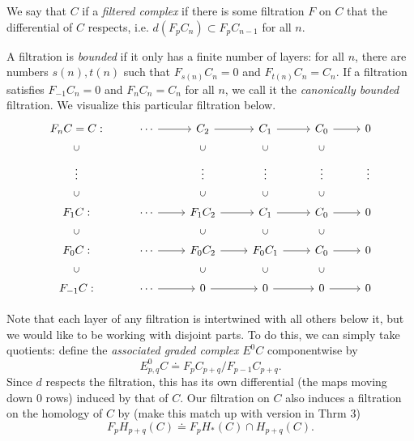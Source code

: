 \documentclass[twoside,10pt]{article}
\begin{document}
\begin{defn}[]
	We say that $C$ if a \textit{filtered complex} if there is some filtration $F$ on $C$ that the differential of $C$ respects, i.e. $d(F_{p}C_{n}) \subset F_{p}C_{n-1}$ for all $n$.
\end{defn}

A filtration is \textit{bounded} if it only has a finite number of layers: for all $n$, there are numbers $s(n), t(n)$ such that $F_{s(n)}C_{n}=0$ and $F_{t(n)}C_{n}=C_{n}$. If a filtration satisfies $F_{-1}C_n=0$ and $F_{n}C_{n}=C_{n}$ for all $n$, we call it the \textit{canonically bounded} filtration. We visualize this particular filtration below.
\[
	\begin{tikzcd}
		F_{n}C = C:&\cdots\arrow[r]&C_{2}\arrow[r]&C_1\arrow[r]&C_{0}\arrow[r]&0\\
		\vdots\arrow[draw=none]{u}[sloped,auto=false]{\subset}&&\vdots\arrow[draw=none]{u}[sloped,auto=false]{\subset}&\vdots\arrow[draw=none]{u}[sloped,auto=false]{\subset}&\vdots\arrow[draw=none]{u}[sloped,auto=false]{\subset}&\vdots\\
		F_{1}C:\arrow[draw=none]{u}[sloped,auto=false]{\subset}&\cdots\arrow[r]&F_{1}C_{2}\arrow[r]\arrow[draw=none]{u}[sloped,auto=false]{\subset}&C_1\arrow[r]\arrow[draw=none]{u}[sloped,auto=false]{\subset}&C_{0}\arrow[r]\arrow[draw=none]{u}[sloped,auto=false]{\subset}&0\\
		F_{0}C:\arrow[draw=none]{u}[sloped,auto=false]{\subset}&\cdots\arrow[r]&F_{0}C_{2}\arrow[draw=none]{u}[sloped,auto=false]{\subset}\arrow[r]&F_{0}C_1\arrow[draw=none]{u}[sloped,auto=false]{\subset}\arrow[r]&C_{0}\arrow[draw=none]{u}[sloped,auto=false]{\subset}\arrow[r]&0\\
		F_{-1}C:\arrow[draw=none]{u}[sloped,auto=false]{\subset}&\cdots\arrow[r]&0\arrow[draw=none]{u}[sloped,auto=false]{\subset}\arrow[r]&0\arrow[draw=none]{u}[sloped,auto=false]{\subset}\arrow[r]&0\arrow[draw=none]{u}[sloped,auto=false]{\subset}\arrow[r]&0
	\end{tikzcd}
\]

Note that each layer of any filtration is intertwined with all others below it, but we would like to be working with disjoint parts. To do this, we can simply take quotients: define the \textit{associated graded complex} $E^{0}C$ componentwise by
\[
	E_{p,q}^{0}C \doteq F_{p}C_{p+q}/F_{p-1}C_{p+q}.
\] Since $d$ respects the filtration, this has its own differential {\color{red}(the maps moving down 0 rows)} induced by that of $C$. Our filtration on $C$ also induces a filtration on the homology of $C$ by {\color{red}(make this match up with version in Thrm 3)}
\[
	F_{p}H_{p+q}(C) \doteq F_{p}H_{*}(C) \cap H_{p+q}(C).
\]
\end{document}
